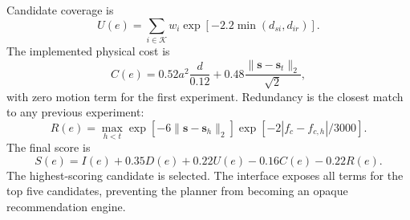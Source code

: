 \documentclass[conference]{IEEEtran}
\newcommand{\vect}[1]{\boldsymbol{#1}}
\begin{document}
Candidate coverage is
\begin{equation}
 U(e)=\sum_{i\in\mathcal{K}}w_i\exp[-2.2\min(d_{si},d_{ir})].
\end{equation}
The implemented physical cost is
\begin{equation}
 C(e)=0.52a^2\frac{d}{0.12}+0.48\frac{\|\vect{s}-\vect{s}_{t}\|_2}{\sqrt2},
 \label{eq:cost}
\end{equation}
with zero motion term for the first experiment. Redundancy is the closest match to any previous experiment:
\begin{equation}
 R(e)=\max_{h<t}\exp[-6\|\vect{s}-\vect{s}_h\|_2]
 \exp[-2|f_c-f_{c,h}|/3000].
 \label{eq:repeat}
\end{equation}
The final score is
\begin{equation}
 S(e)=I(e)+0.35D(e)+0.22U(e)-0.16C(e)-0.22R(e).
 \label{eq:planner}
\end{equation}
The highest-scoring candidate is selected. The interface exposes all terms for the top five candidates, preventing the planner from becoming an opaque recommendation engine.
\end{document}
